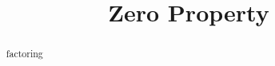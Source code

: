 \documentclass{ximera}
\title{Zero Property}
\begin{document}
\begin{abstract}
factoring
\end{abstract}
\maketitle
\end{document}

